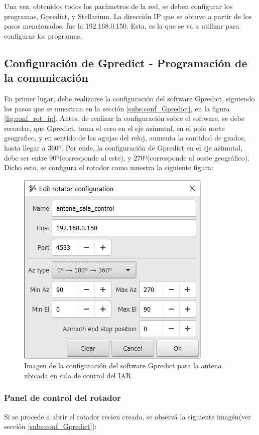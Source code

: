 Una vez, obtenidos todos los parámetros de la red, se deben configurar los programas, Gpredict, y Stellarium. La dirección IP que se obtuvo a partir de los pasos mencionados, fue la 192.168.0.150. Esta, es la que se va a utilizar para configurar los programas. 

\subsection{Configuración de Gpredict - Programación de la comunicación} 

En primer lugar, debe realizarse la configuración del software Gpredict, siguiendo los pasos que se muestran en la sección \ref{subs:conf_Gpredict}, en la figura \ref{fig:conf_rot_ip}. Antes. de realizar la configuración sobre el software, se debe recordar, que Gpredict, toma el cero en el eje azimutal, en el polo norte geografico, y en sentido de las agujas del reloj, aumenta la cantidad de grados, hasta llegar a 360º. Por ende, la configuración de Gpredict en el eje azimutal, debe ser entre 90º(corresponde al este), y 270º(corresponde al
oeste geográfico). Dicho esto, se configura el rotador como muestra la siguiente figura: 
 
\begin{figure}[ht]
	\centering 
	\includegraphics{conf_rotador_gpr}
	\caption{Imagen de la configuración del software Gpredict para la antena ubicada en sala de control del IAR. }
	\label{fig:conf_rot_sala_control}
\end{figure}
%
\subsubsection{Panel de control del rotador}
Si se procede a abrir el rotador recien creado, se observá la siguiente imagén(ver sección \ref{subs:conf_Gpredict}): 

